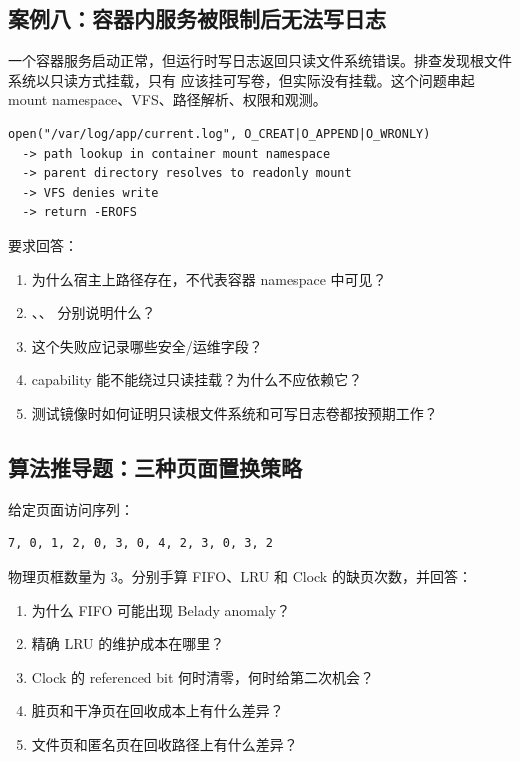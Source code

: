 \subsection{案例八：容器内服务被限制后无法写日志}

一个容器服务启动正常，但运行时写日志返回只读文件系统错误。排查发现根文件系统以只读方式挂载，只有  应该挂可写卷，但实际没有挂载。这个问题串起 mount namespace、VFS、路径解析、权限和观测。

\begin{lstlisting}
open("/var/log/app/current.log", O_CREAT|O_APPEND|O_WRONLY)
  -> path lookup in container mount namespace
  -> parent directory resolves to readonly mount
  -> VFS denies write
  -> return -EROFS
\end{lstlisting}

要求回答：

\begin{enumerate}
\tightlist
\item 为什么宿主上路径存在，不代表容器 namespace 中可见？
\item {}、、 分别说明什么？
\item 这个失败应记录哪些安全/运维字段？
\item capability 能不能绕过只读挂载？为什么不应依赖它？
\item 测试镜像时如何证明只读根文件系统和可写日志卷都按预期工作？
\end{enumerate}

\subsection{算法推导题：三种页面置换策略}

给定页面访问序列：

\begin{lstlisting}
7, 0, 1, 2, 0, 3, 0, 4, 2, 3, 0, 3, 2
\end{lstlisting}

物理页框数量为 3。分别手算 FIFO、LRU 和 Clock 的缺页次数，并回答：

\begin{enumerate}
\tightlist
\item 为什么 FIFO 可能出现 Belady anomaly？
\item 精确 LRU 的维护成本在哪里？
\item Clock 的 referenced bit 何时清零，何时给第二次机会？
\item 脏页和干净页在回收成本上有什么差异？
\item 文件页和匿名页在回收路径上有什么差异？
\end{enumerate}

